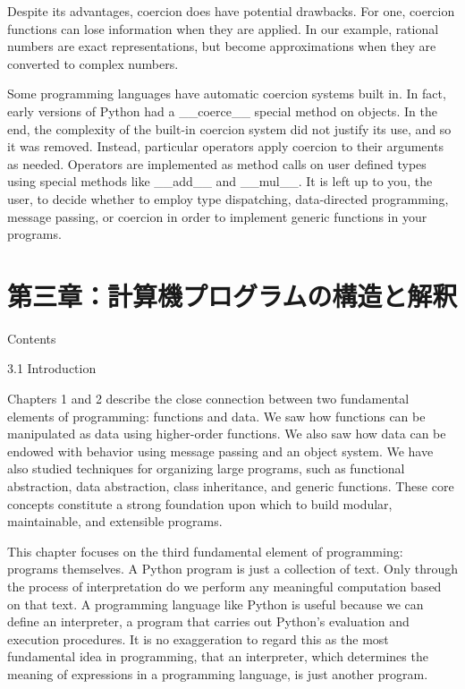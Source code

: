 \documentclass[letterpaper,10pt,dvipdfmx]{sphinxmanual}
\begin{document}
Despite its advantages, coercion does have potential drawbacks. For one, coercion functions can lose information when they are applied. In our example, rational numbers are exact representations, but become approximations when they are converted to complex numbers.

Some programming languages have automatic coercion systems built in. In fact, early versions of Python had a \_\_coerce\_\_ special method on objects. In the end, the complexity of the built-in coercion system did not justify its use, and so it was removed. Instead, particular operators apply coercion to their arguments as needed. Operators are implemented as method calls on user defined types using special methods like \_\_add\_\_ and \_\_mul\_\_. It is left up to you, the user, to decide whether to employ type dispatching, data-directed programming, message passing, or coercion in order to implement generic functions in your programs.


\chapter{第三章：計算機プログラムの構造と解釈}
\label{interpretation::doc}\label{interpretation:id1}
Contents

3.1   Introduction

Chapters 1 and 2 describe the close connection between two fundamental elements of programming: functions and data. We saw how functions can be manipulated as data using higher-order functions. We also saw how data can be endowed with behavior using message passing and an object system. We have also studied techniques for organizing large programs, such as functional abstraction, data abstraction, class inheritance, and generic functions. These core concepts constitute a strong foundation upon which to build modular, maintainable, and extensible programs.

This chapter focuses on the third fundamental element of programming: programs themselves. A Python program is just a collection of text. Only through the process of interpretation do we perform any meaningful computation based on that text. A programming language like Python is useful because we can define an interpreter, a program that carries out Python's evaluation and execution procedures. It is no exaggeration to regard this as the most fundamental idea in programming, that an interpreter, which determines the meaning of expressions in a programming language, is just another program.
\end{document}
